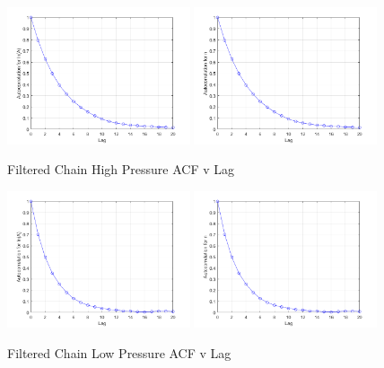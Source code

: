 \documentclass{article}
\begin{document}
\begin{figure}[htb]
\centering
\includegraphics[width=0.48\textwidth]{ACF_lnA_filt_HP.png}
\includegraphics[width=0.48\textwidth]{ACF_n_filt_HP.png}
\caption{Filtered Chain High Pressure ACF v Lag}
\label{autoHP}
\end{figure}

\begin{figure}[htb]
\centering
\includegraphics[width=0.48\textwidth]{ACF_lnA_filt_LP.png}
\includegraphics[width=0.48\textwidth]{ACF_n_filt_LP.png}
\caption{Filtered Chain Low Pressure ACF v Lag}
\label{autoLP}
\end{figure}
\end{document}
